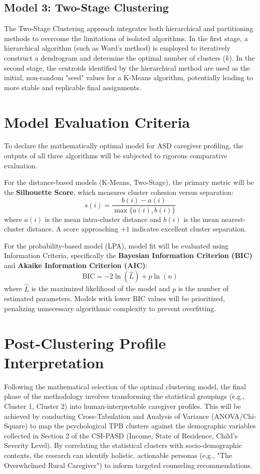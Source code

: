 \subsection{Model 3: Two-Stage Clustering}
The Two-Stage Clustering approach integrates both hierarchical and partitioning methods to overcome the limitations of isolated algorithms. In the first stage, a hierarchical algorithm (such as Ward's method) is employed to iteratively construct a dendrogram and determine the optimal number of clusters ($k$). In the second stage, the centroids identified by the hierarchical method are used as the initial, non-random "seed" values for a K-Means algorithm, potentially leading to more stable and replicable final assignments.


\section{Model Evaluation Criteria}
To declare the mathematically optimal model for ASD caregiver profiling, the outputs of all three algorithms will be subjected to rigorous comparative evaluation.

For the distance-based models (K-Means, Two-Stage), the primary metric will be the \textbf{Silhouette Score}, which measures cluster cohesion versus separation:
\begin{equation}
    s(i) = \frac{b(i) - a(i)}{\max\{a(i), b(i)\}}
\end{equation}
where $a(i)$ is the mean intra-cluster distance and $b(i)$ is the mean nearest-cluster distance. A score approaching $+1$ indicates excellent cluster separation.

For the probability-based model (LPA), model fit will be evaluated using Information Criteria, specifically the \textbf{Bayesian Information Criterion (BIC)} and \textbf{Akaike Information Criterion (AIC)}:
\begin{equation}
    \text{BIC} = -2 \ln(\hat{L}) + p \ln(n)
\end{equation}
where $\hat{L}$ is the maximized likelihood of the model and $p$ is the number of estimated parameters. Models with lower BIC values will be prioritized, penalizing unnecessary algorithmic complexity to prevent overfitting.

\section{Post-Clustering Profile Interpretation}
Following the mathematical selection of the optimal clustering model, the final phase of the methodology involves transforming the statistical groupings (e.g., Cluster 1, Cluster 2) into human-interpretable caregiver profiles. This will be achieved by conducting Cross-Tabulation and Analysis of Variance (ANOVA/Chi-Square) to map the psychological TPB clusters against the demographic variables collected in Section 2 of the CSI-PASD (Income, State of Residence, Child's Severity Level). By correlating the statistical clusters with socio-demographic contexts, the research can identify holistic, actionable personas (e.g., "The Overwhelmed Rural Caregiver") to inform targeted counseling recommendations.
